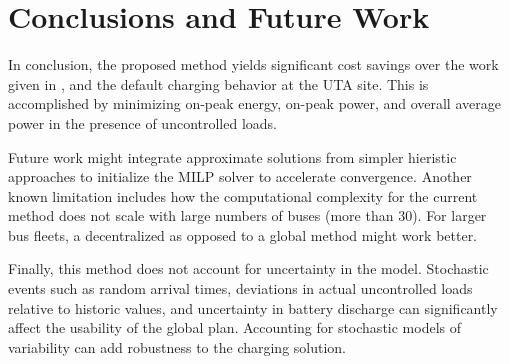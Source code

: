 \section{Conclusions and Future Work }
In conclusion, the proposed method yields significant cost savings over the work given in \cite{He_2019_Fast}, and the default charging behavior at the UTA site. This is accomplished by minimizing on-peak energy, on-peak power, and overall average power in the presence of uncontrolled loads. 
\par Future work might integrate approximate solutions from simpler hieristic approaches to initialize the MILP solver to accelerate convergence. Another known limitation includes how the computational complexity for the current method does not scale with large numbers of buses (more than 30). For larger bus fleets, a decentralized as opposed to a global method might work better. 
\par Finally, this method does not account for uncertainty in the model.  Stochastic events such as random arrival times, deviations in actual uncontrolled loads relative to historic values, and uncertainty in battery discharge can significantly affect the usability of the global plan. Accounting for stochastic models of variability can add robustness to the charging solution.  

